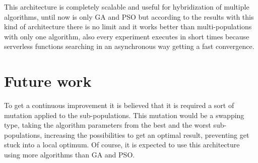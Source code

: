 \documentclass[runningheads]{llncs}
\begin{document}
This architecture is completely scalable and useful for hybridization of
multiple algorithms, until now is only GA and PSO but according to the results
with this kind of architecture there is no limit and it works better than
multi-populations with only one algorithm, also every experiment executes in
short times because serverless functions searching in an asynchronous way
getting a fast convergence.

\section{Future work}

To get a continuous improvement it is believed that it is required a sort of
mutation applied to the sub-populations. This mutation would be a swapping type,
taking the algorithm parameters from the best and the worst sub-populations,
increasing the possibilities to get an optimal result, preventing get stuck into
a local optimum. Of course, it is expected to use this architecture using more
algorithms than GA and PSO.



      
  
\end{document}
